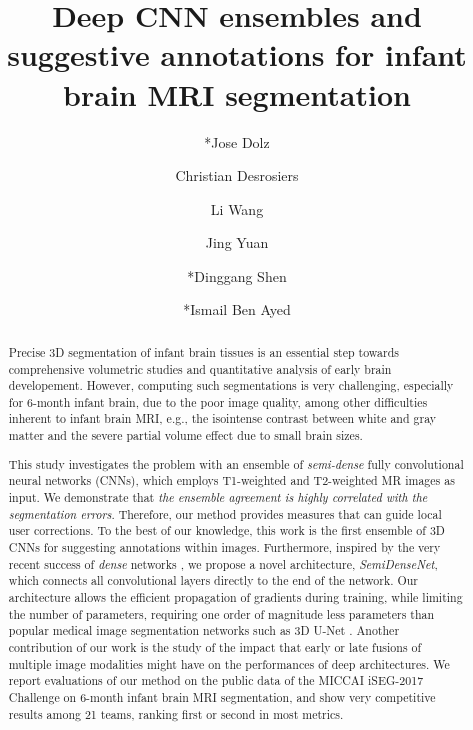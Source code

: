\documentclass[twoside,espcrc2]{elsarticle}
\begin{document}
\begin{frontmatter}





\title{Deep CNN ensembles and suggestive annotations for infant brain MRI segmentation}




\author[LIVIA]{*Jose Dolz}
\author[LIVIA]{Christian Desrosiers}
\author[NC]{Li Wang}
\author[XIDIAN]{Jing Yuan}
\author[NC,KU]{*Dinggang Shen}
\author[LIVIA]{*Ismail Ben Ayed}

\address[LIVIA]{Ecole de Technologie Superieure (ETS), University of Quebec, Montreal, QC, Canada}
\address[XIDIAN]{Xidian University, School of Mathematics and Statistics, Xi'an, China}
\address[NC]{Department of Radiology and BRIC, University of North Carolina at Chapel Hill, NC 27599, USA}
\address[KU]{Department of Brain and Cognitive Engineering, Korea University, Seoul 02841, Republic of Korea}






\begin{abstract}

Precise 3D segmentation of infant brain tissues is an essential step towards comprehensive volumetric studies and quantitative analysis of early brain developement. However, computing such segmentations is very challenging, especially for 6-month infant brain, due to the poor image quality, among other difficulties inherent to infant brain MRI, e.g., the isointense contrast between white and gray matter and the severe partial volume effect due to small brain sizes. 

This study investigates the problem with an ensemble of {\em semi-dense} fully convolutional neural networks (CNNs), which employs T1-weighted and T2-weighted MR images as input. We demonstrate that {\em the ensemble agreement is highly correlated with the segmentation errors}. Therefore, our method provides measures that can guide local user corrections. To the best of our knowledge, this work is the first ensemble of 3D CNNs for suggesting annotations within images. Furthermore, inspired by the very recent success of {\em dense} networks \cite{huang2016densely}, we propose a novel architecture, \emph{SemiDenseNet}, which connects all convolutional layers directly to the end of the network. Our architecture allows the efficient propagation of gradients during training, while limiting the number of parameters, requiring one order of magnitude less parameters than popular medical image segmentation networks such as 3D U-Net \cite{cciccek20163d}. Another contribution of our work is the study of the impact that early or late fusions of multiple image modalities might have on the performances of deep architectures. We report evaluations of our method on the public data of the MICCAI iSEG-2017 Challenge on 6-month infant brain MRI segmentation, and show very competitive results among 21 teams, ranking first or second in most metrics.
 

\end{abstract}
\end{frontmatter}
\end{document}

